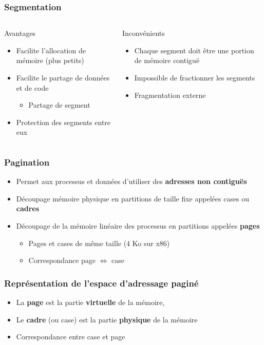 \begin{frame}
\frametitle{Segmentation}
\begin{columns}
\begin{block}{Avantages}
\begin{itemize}
\item Facilite l'allocation de mémoire (plus petits)
\item Facilite le partage de données et de code
\begin{itemize}
\item Partage de segment
\end{itemize}
\item Protection des segments entre eux
\end{itemize}
\end{block}
\begin{block}{Inconvénients}
\begin{itemize}
\item Chaque segment doit être une portion de mémoire contiguë
\item Impossible de fractionner les segments
\item Fragmentation externe
\end{itemize}
\end{block}
\end{columns}
\end{frame}



\begin{frame}
\frametitle{Pagination}
\begin{itemize}
\item Permet aux processus et données d'utiliser des \textbf{adresses non contiguës}
\item Découpage mémoire physique en partitions de taille fixe appelées cases ou \textbf{cadres}
\item Découpage de la mémoire linéaire des processus en partitions appelées \textbf{pages}
\begin{itemize}
\item Pages et cases de même taille (4 Ko sur x86)
\item Correspondance page $\Leftrightarrow$ case
\end{itemize}
\end{itemize}
\end{frame}


\begin{frame}
\frametitle{Représentation de l'espace d'adressage paginé}
\begin{itemize}
\item La \textbf{page} est la partie \textbf{virtuelle} de la mémoire,
\item Le \textbf{cadre} (ou case) est la partie \textbf{physique} de la mémoire
\item Correspondance entre case et page
\end{itemize}
\end{frame}

